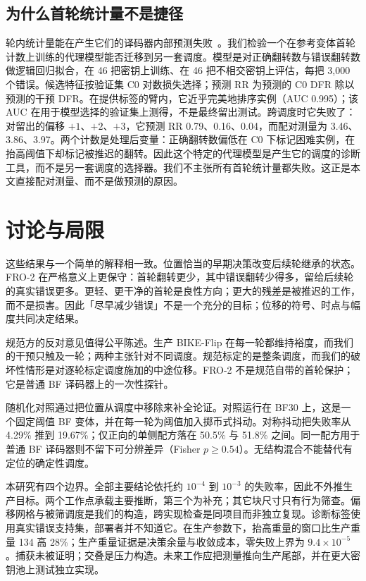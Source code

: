 \documentclass[UTF8,a4paper,10pt,onecolumn]{ctexart}
\begin{document}
\subsection{为什么首轮统计量不是捷径}\label{sec:counterfactual}

轮内统计量能在产生它们的译码器内部预测失败~\cite{kim2021logistic,paiva2022pickyfix}。我们检验一个在参考变体首轮计数上训练的代理模型能否迁移到另一套调度。模型是对正确翻转数与错误翻转数做逻辑回归拟合，在 46 把密钥上训练、在 46 把不相交密钥上评估，每把 3,000 个错误。候选特征按验证集 C0 对数损失选择；预测 RR 为预测的 C0 DFR 除以预测的干预 DFR。在提供标签的臂内，它近乎完美地排序实例（AUC 0.995）；该 AUC 在用于模型选择的验证集上测得，不是最终留出测试。跨调度时它失败了：对留出的偏移 $+1$、$+2$、$+3$，它预测 RR 0.79、0.16、0.04，而配对测量为 3.46、3.86、3.97。两个计数是处理后变量：正确翻转数偏低在 C0 下标记困难实例，在抬高阈值下却标记被推迟的翻转。因此这个特定的代理模型是产生它的调度的诊断工具，而不是另一套调度的选择器。我们不主张所有首轮统计量都失败。这正是本文直接配对测量、而不是做预测的原因。
\section{讨论与局限}\label{sec:discussion}

这些结果与一个简单的解释相一致。位置恰当的早期决策改变后续轮继承的状态。FRO-2 在严格意义上更保守：首轮翻转更少，其中错误翻转少得多，留给后续轮的真实错误更多。更轻、更干净的首轮是良性方向；更大的残差是被推迟的工作，而不是损害。因此「尽早减少错误」不是一个充分的目标；位移的符号、时点与幅度共同决定结果。

规范方的反对意见值得公平陈述。生产 BIKE-Flip 在每一轮都维持裕度，而我们的干预只触及一轮；两种主张针对不同调度。规范标定的是整条调度，而我们的破坏性情形是对逐轮标定调度施加的中途位移。FRO-2 不是规范自带的首轮保护；它是普通 BF 译码器上的一次性探针。

随机化对照通过把位置从调度中移除来补全论证。对照运行在 BF30 上，这是一个固定阈值 BF 变体，并在每一轮为阈值加入掷币式抖动。对称抖动把失败率从 4.29\% 推到 19.67\%；仅正向的单侧配方落在 50.5\% 与 51.8\% 之间。同一配方用于普通 BF 译码器则不留下可分辨差异（Fisher $p\ge0.54$）。无结构混合不能替代有定位的确定性调度。

本研究有四个边界。全部主要结论依托约 $10^{-4}$ 到 $10^{-3}$ 的失败率，因此不外推生产目标。两个工作点承载主要推断，第三个为补充；其它块尺寸只有行为筛查。偏移网格与被筛调度是我们的构造，跨实现检查是同项目而非独立复现。诊断标签使用真实错误支持集，部署者并不知道它。在生产参数下，抬高重量的窗口比生产重量 134 高 28\%；生产重量证据是决策余量与收敛成本，零失败上界为 $9.4\times10^{-5}$。捕获未被证明；交叠是压力构造。未来工作应把测量推向生产尾部，并在更大密钥池上测试独立实现。
\end{document}
